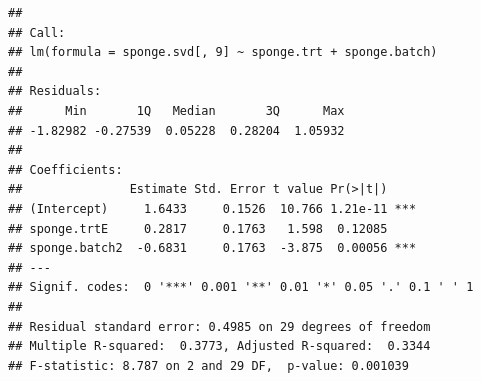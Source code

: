 \documentclass[]{book}
\newenvironment{Shaded}{\begin{snugshade}}{\end{snugshade}}
\newcommand{\KeywordTok}[1]{\textcolor[rgb]{0.13,0.29,0.53}{\textbf{#1}}}
\newcommand{\DataTypeTok}[1]{\textcolor[rgb]{0.13,0.29,0.53}{#1}}
\newcommand{\DecValTok}[1]{\textcolor[rgb]{0.00,0.00,0.81}{#1}}
\newcommand{\StringTok}[1]{\textcolor[rgb]{0.31,0.60,0.02}{#1}}
\newcommand{\CommentTok}[1]{\textcolor[rgb]{0.56,0.35,0.01}{\textit{#1}}}
\newcommand{\OperatorTok}[1]{\textcolor[rgb]{0.81,0.36,0.00}{\textbf{#1}}}
\newcommand{\NormalTok}[1]{#1}
\begin{document}
\begin{verbatim}
## 
## Call:
## lm(formula = sponge.svd[, 9] ~ sponge.trt + sponge.batch)
## 
## Residuals:
##      Min       1Q   Median       3Q      Max 
## -1.82982 -0.27539  0.05228  0.28204  1.05932 
## 
## Coefficients:
##               Estimate Std. Error t value Pr(>|t|)    
## (Intercept)     1.6433     0.1526  10.766 1.21e-11 ***
## sponge.trtE     0.2817     0.1763   1.598  0.12085    
## sponge.batch2  -0.6831     0.1763  -3.875  0.00056 ***
## ---
## Signif. codes:  0 '***' 0.001 '**' 0.01 '*' 0.05 '.' 0.1 ' ' 1
## 
## Residual standard error: 0.4985 on 29 degrees of freedom
## Multiple R-squared:  0.3773, Adjusted R-squared:  0.3344 
## F-statistic: 8.787 on 2 and 29 DF,  p-value: 0.001039
\end{verbatim}

\begin{Shaded}
\end{Shaded}
\end{document}

